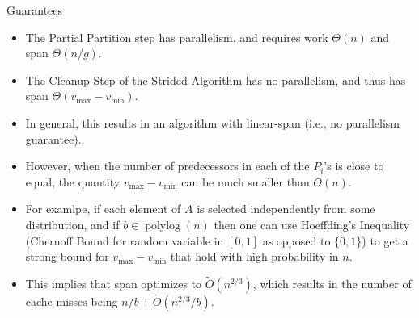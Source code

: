 \documentclass{beamer}
\newcommand{\polylog}{\operatorname{polylog}}
\begin{document}
\begin{frame}[t]{Guarantees}
	\begin{itemize}
		\item	The Partial Partition step has parallelism, and requires work $\Theta(n)$ and span $\Theta(n/g)$.
		\item The Cleanup Step of the Strided Algorithm has no parallelism, and thus has span $\Theta(v_{\text{max}} - v_{\text{min}})$.
		\item In general, this results in an algorithm with linear-span (i.e., no parallelism guarantee).
		\item However, when the number of predecessors in each of the $P_i$'s is close to equal, the quantity $v_{\text{max}} - v_{\text{min}}$ can be much smaller than $O(n)$.
		\item For examlpe, if each element of $A$ is selected independently from some distribution, and if $b \in \polylog(n)$ then one can use Hoeffding's Inequality (Chernoff Bound for random variable in $[0,1]$ as opposed to $\{0,1\}$) to get a strong bound for $v_{\text{max}} - v_{\text{min}}$ that hold with high probability in $n$.
		\item This implies that span optimizes to $\tilde{O}(n^{2/3})$, which results in the number of cache misses being $n / b + \tilde{O}(n^{2/3} / b)$.
	\end{itemize}

  
\end{frame}
\end{document}
